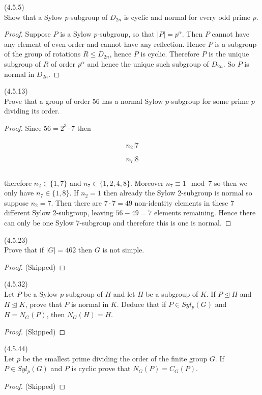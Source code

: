 \documentclass{exam}
\begin{document}
\begin{questions}
\question(4.5.5)\\
Show that a Sylow $p$-subgroup of $D_{2n}$ is cyclic and normal for every odd prime $p$.

\begin{proof}
  Suppose $P$ is a Sylow $p$-subgroup, so that $|P|=p^\alpha$.  Then $P$ cannot have any element of even order and cannot have any reflection.  Hence $P$ is a subgroup of the group of rotations $R\leq D_{2n}$, hence $P$ is cyclic.  Therefore $P$ is the unique subgroup of $R$ of order $p^\alpha$ and hence the unique such subgroup of $D_{2n}$.  So $P$ is normal in $D_{2n}$.
\end{proof}

\question(4.5.13)\\
Prove that a group of order 56 has a normal Sylow $p$-subgroup for some prime $p$ dividing its order.

\begin{proof}
  Since $56=2^3\cdot 7$ then

  \begin{align*}
    n_2 | 7 \\\\
    n_7 | 8 \\\\
  \end{align*}

  therefore $n_2\in \{1,7\}$ and $n_7\in \{1,2,4,8\}$.  Moreover $n_7\equiv 1\mod 7$ so then we only have $n_7\in\{1,8\}$.  If $n_2=1$ then already the Sylow 2-subgroup is normal so suppose $n_2=7$.  Then there are $7\cdot 7=49$ non-identity elements in these 7 different Sylow 2-subgroup, leaving $56-49=7$ elements remaining.  Hence there can only be one Sylow 7-subgroup and therefore this is one is normal.
\end{proof}

\question(4.5.23)\\
Prove that if $|G|=462$ then $G$ is not simple.

\begin{proof}
  (Skipped)
\end{proof}

\question(4.5.32)\\
Let $P$ be a Sylow $p$-subgroup of $H$ and let $H$ be a subgroup of $K$.  If $P\trianglelefteq H$ and $H\trianglelefteq K$, prove that $P$ is normal in $K$.  Deduce that if $P\in Syl_p(G)$ and $H=N_G(P)$, then $N_G(H)=H$.

\begin{proof}
  (Skipped)
\end{proof}

\question(4.5.44)\\
Let $p$ be the smallest prime dividing the order of the finite group $G$.  If $P\in Syl_p(G)$ and $P$ is cyclic prove that $N_G(P) = C_G(P)$.

\begin{proof}
  (Skipped)
\end{proof}



\end{questions}
\end{document}
